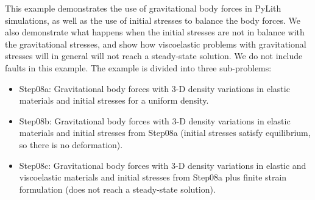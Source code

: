 This example demonstrates the use of gravitational body forces in
PyLith simulations, as well as the use of initial stresses to balance
the body forces. We also demonstrate what happens when the initial
stresses are not in balance with the gravitational stresses, and show
how viscoelastic problems with gravitational stresses will in general
will not reach a steady-state solution. We do not include faults in
this example. The example is divided into three sub-problems:
\begin{itemize}
\item Step08a: Gravitational body forces with 3-D density variations
  in elastic materials and initial stresses for a uniform density.
\item Step08b: Gravitational body forces with 3-D density variations
  in elastic materials and initial stresses from Step08a (initial
  stresses satisfy equilibrium, so there is no deformation).
\item Step08c: Gravitational body forces with 3-D density variations
  in elastic and viscoelastic materials and initial stresses from
  Step08a plus finite strain formulation (does not reach a steady-state
  solution).
\end{itemize}

